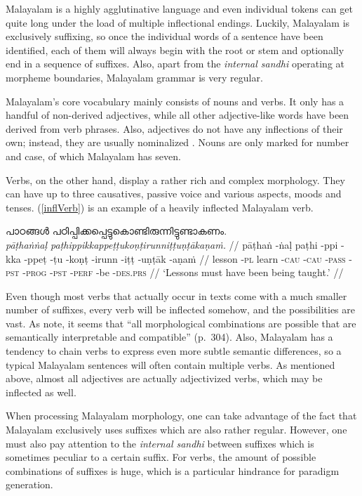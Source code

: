 \documentclass[a4paper]{article}
\newcommand{\afx}[1]{\textsc{#1}}
\begin{document}
Malayalam is a highly agglutinative language and even individual tokens can get quite long under the load of multiple inflectional endings. Luckily, Malayalam is exclusively suffixing, so once the individual words of a sentence have been identified, each of them will always begin with the root or stem and optionally end in a sequence of suffixes. Also, apart from the \textit{internal sandhi} operating at morpheme boundaries, Malayalam grammar is very regular.

Malayalam's core vocabulary mainly consists of nouns and verbs. It only has a handful of non-derived adjectives, while all other adjective-like words have been derived from verb phrases. Also, adjectives do not have any inflections of their own; instead, they are usually nominalized \parencite[p.~349ff]{asherKumari}. Nouns are only marked for number and case, of which Malayalam has seven.

Verbs, on the other hand, display a rather rich and complex morphology. They can have up to three causatives, passive voice and various aspects, moods and tenses. (\ref{inflVerb}) is an example of a heavily inflected Malayalam verb.

\ex\label{inflVerb}\begingl[everygla=\itshape]
\glpreamble പാഠങ്ങൾ പഠിപ്പിക്കപ്പെട്ടുകൊണ്ടിരുന്നിട്ടുണ്ടാകണം. \\
\textit{pāṭhaṅṅaḷ paṭhippikkappeṭṭukoṇṭirunniṭṭuṇṭākaṇaṁ.} //
\gla pāṭhaṅ -ṅaḷ {} paṭhi -ppi -kka -ppeṭ -ṭu -koṇṭ -irunn -iṭṭ -uṇṭāk -aṇaṁ //
\glc lesson -\afx{pl} {} learn -\afx{cau} -\afx{cau} -\afx{pass} -\afx{pst} -\afx{prog} -\afx{pst} -\afx{perf} -be -\afx{des.prs} //
\glft `Lessons must have been being taught.' \parencite[p.~304]{asherKumari} //
\endgl\xe

Even though most verbs that actually occur in texts come with a much smaller number of suffixes, every verb will be inflected somehow, and the possibilities are vast. As \textcite{asherKumari} note, it seems that ``all morphological combinations are possible that are semantically interpretable and compatible'' (p.~304). Also, Malayalam has a tendency to chain verbs to express even more subtle semantic differences, so a typical Malayalam sentences will often contain multiple verbs. As mentioned above, almost all adjectives are actually adjectivized verbs, which may be inflected as well.

When processing Malayalam morphology, one can take advantage of the fact that Malayalam exclusively uses suffixes which are also rather regular. However, one must also pay attention to the \textit{internal sandhi} between suffixes which is sometimes peculiar to a certain suffix. For verbs, the amount of possible combinations of suffixes is huge, which is a particular hindrance for paradigm generation.
\end{document}
